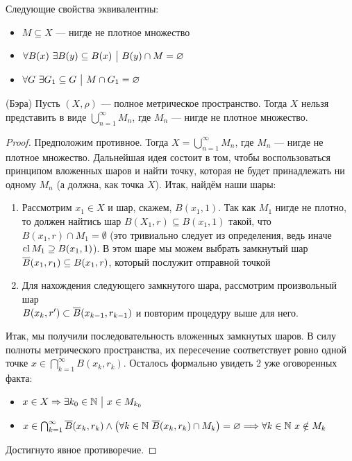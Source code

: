 \begin{proposition}
	Следующие свойства эквивалентны:
	\begin{itemize}
		\item $M \subseteq X$ --- нигде не плотное множество
		
		\item $\forall B(x)\ \exists B(y) \subseteq B(x) \ \big|\  B(y) \cap M = \varnothing$
		
		\item $\forall G\ \exists G_1 \subseteq G \ \big|\  M \cap G_1 = \varnothing$
	\end{itemize}
\end{proposition}

\begin{theorem} (Бэра)
	Пусть $(X, \rho)$ --- полное метрическое пространство. Тогда $X$ нельзя представить в виде $\bigcup_{n = 1}^\infty M_n$, где $M_n$ --- нигде не плотное множество.
\end{theorem}

\begin{proof}
	Предположим противное. Тогда $X = \bigcup_{n = 1}^\infty M_n$, где $M_n$ --- нигде не плотное множество. Дальнейшая идея состоит в том, чтобы воспользоваться принципом вложенных шаров и найти точку, которая не будет принадлежать ни одному $M_n$ (а должна, как точка $X$). Итак, найдём наши шары:
	\begin{enumerate}
		\item Рассмотрим $x_1 \in X$ и шар, скажем, $B(x_1, 1)$. Так как $M_1$ нигде не плотно, то должен найтись шар $B(X_1, r) \subseteq B(x_1, 1)$ такой, что $B(x_1, r) \cap M_1 = \emptyset$ (это тривиально следует из определения, ведь иначе $\operatorname{cl} M_1 \supseteq B(x_1, 1)$). В этом шаре мы можем выбрать замкнутый шар $\overline{B}(x_1, r_1) \subseteq B(x_1, r)$, который послужит отправной точкой
		
		\item Для нахождения следующего замкнутого шара, рассмотрим произвольный шар \\ $B(x_k, r') \subset \overline{B}(x_{k - 1}, r_{k - 1})$ и повторим процедуру выше для него.
	\end{enumerate}
	Итак, мы получили последовательность вложенных замкнутых шаров. В силу полноты метрического пространства, их пересечение соответствует ровно одной точке $x \in \bigcap_{k = 1}^\infty B(x_k, r_k)$. Осталось формально увидеть 2 уже оговоренных факта:
	\begin{itemize}
		\item $x \in X \Rightarrow \exists k_0 \in \mathbb{N} \ \big|\  x \in M_{k_0}$
		
		\item $x \in \bigcap_{k = 1}^\infty \overline{B}(x_k, r_k) \wedge \big(\forall k \in \mathbb{N}\ \overline{B}(x_k, r_k) \cap M_k\big) = \varnothing \Longrightarrow \forall k \in \mathbb{N}\ x \notin M_k$
	\end{itemize}
	Достигнуто явное противоречие.
\end{proof}

